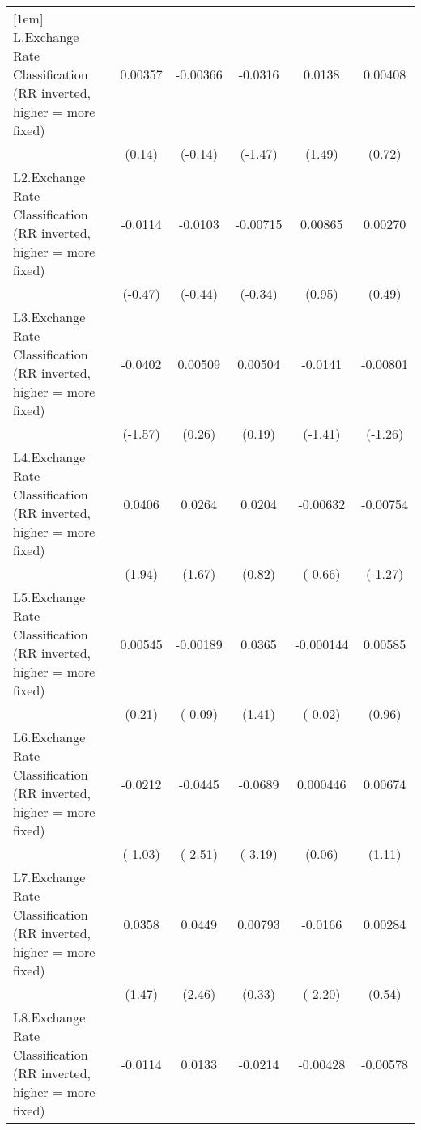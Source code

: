 {\begin{longtable}{l*{5}{c}}
[1em]
L.Exchange Rate Classification (RR inverted, higher = more fixed)&  0.00357         & -0.00366         &  -0.0316         &   0.0138         &  0.00408         \\
                &   (0.14)         &  (-0.14)         &  (-1.47)         &   (1.49)         &   (0.72)         \\
[1em]
L2.Exchange Rate Classification (RR inverted, higher = more fixed)&  -0.0114         &  -0.0103         & -0.00715         &  0.00865         &  0.00270         \\
                &  (-0.47)         &  (-0.44)         &  (-0.34)         &   (0.95)         &   (0.49)         \\
[1em]
L3.Exchange Rate Classification (RR inverted, higher = more fixed)&  -0.0402         &  0.00509         &  0.00504         &  -0.0141         & -0.00801         \\
                &  (-1.57)         &   (0.26)         &   (0.19)         &  (-1.41)         &  (-1.26)         \\
[1em]
L4.Exchange Rate Classification (RR inverted, higher = more fixed)&   0.0406         &   0.0264         &   0.0204         & -0.00632         & -0.00754         \\
                &   (1.94)         &   (1.67)         &   (0.82)         &  (-0.66)         &  (-1.27)         \\
[1em]
L5.Exchange Rate Classification (RR inverted, higher = more fixed)&  0.00545         & -0.00189         &   0.0365         &-0.000144         &  0.00585         \\
                &   (0.21)         &  (-0.09)         &   (1.41)         &  (-0.02)         &   (0.96)         \\
[1em]
L6.Exchange Rate Classification (RR inverted, higher = more fixed)&  -0.0212         &  -0.0445\sym{*}  &  -0.0689\sym{**} & 0.000446         &  0.00674         \\
                &  (-1.03)         &  (-2.51)         &  (-3.19)         &   (0.06)         &   (1.11)         \\
[1em]
L7.Exchange Rate Classification (RR inverted, higher = more fixed)&   0.0358         &   0.0449\sym{*}  &  0.00793         &  -0.0166\sym{*}  &  0.00284         \\
                &   (1.47)         &   (2.46)         &   (0.33)         &  (-2.20)         &   (0.54)         \\
[1em]
L8.Exchange Rate Classification (RR inverted, higher = more fixed)&  -0.0114         &   0.0133         &  -0.0214         & -0.00428         & -0.00578         \\

\end{longtable}}
